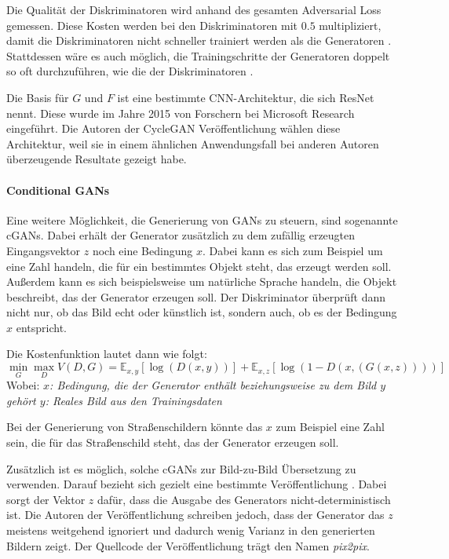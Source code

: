 Die Qualität der Diskriminatoren wird anhand des gesamten Adversarial Loss gemessen. Diese Kosten werden bei den Diskriminatoren mit $0.5$ multipliziert, damit die Diskriminatoren nicht schneller trainiert werden als die Generatoren \cite{cyclegan-tutorial}. Stattdessen wäre es auch möglich, die Trainingschritte der Generatoren doppelt so oft durchzuführen, wie die der Diskriminatoren \cite{visualApproach}.

Die Basis für $G$ und $F$ ist eine bestimmte \ac{CNN}-Architektur, die sich \ac{ResNet} nennt. Diese wurde im Jahre 2015 von Forschern bei Microsoft Research eingeführt. Die Autoren der \ac{CycleGAN} Veröffentlichung wählen diese Architektur, weil sie in einem ähnlichen Anwendungsfall bei anderen Autoren überzeugende Resultate gezeigt habe.  \cite{resnet} \Cite{cycleGAN}


\paragraph{Conditional GANs}
Eine weitere Möglichkeit, die Generierung von \acp{GAN} zu steuern, sind sogenannte \acp{cGAN}. Dabei erhält der Generator zusätzlich zu dem zufällig erzeugten Eingangsvektor $z$ noch eine Bedingung $x$. Dabei kann es sich zum Beispiel um eine Zahl handeln, die für ein bestimmtes Objekt steht, das erzeugt werden soll. Außerdem kann es sich beispielsweise um natürliche Sprache handeln, die Objekt beschreibt, das der Generator erzeugen soll. Der Diskriminator überprüft dann nicht nur, ob das Bild echt oder künstlich ist, sondern auch, ob es der Bedingung $x$ entspricht.

Die Kostenfunktion lautet dann wie folgt: \cite{pix2pix}
\begin{equation}
   \label{eq:cond_gan}
   \min_{G} \max_{D} V(D,G) = \mathbb{E}_{x, y}[\log(D(x, y))] + \mathbb{E}_{x,z}[\log(1-D(x, (G(x, z))))]
\end{equation}
Wobei: \newline
\emph{\null\quad\quad $x$: Bedingung, die der Generator enthält beziehungsweise zu dem Bild $y$ gehört \newline
\null\quad\quad $y$: Reales Bild aus den Trainingsdaten}

Bei der Generierung von Straßenschildern könnte das $x$ zum Beispiel eine Zahl sein, die für das Straßenschild steht, das der Generator erzeugen soll.

Zusätzlich ist es möglich, solche \acp{cGAN} zur Bild-zu-Bild Übersetzung zu verwenden. Darauf bezieht sich gezielt eine bestimmte Veröffentlichung \cite{pix2pix}. Dabei sorgt der Vektor $z$ dafür, dass die Ausgabe des Generators nicht-deterministisch ist. Die Autoren der Veröffentlichung schreiben jedoch, dass der Generator das $z$ meistens weitgehend ignoriert und dadurch wenig Varianz in den generierten Bildern zeigt. Der Quellcode der Veröffentlichung trägt den Namen \emph{pix2pix}. \cite{pix2pix}

